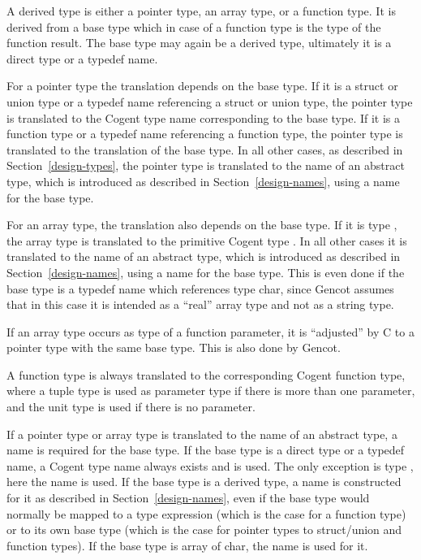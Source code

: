 A derived type is either a pointer type, an array type, or a function type. It is derived from a base type
which in case of a function type is the type of the function result. The base type may again be a derived
type, ultimately it is a direct type or a typedef name.

For a pointer type the translation depends on the base type. If it is a struct or union type or a typedef
name referencing a struct or union type, the pointer type is translated to the Cogent type name corresponding
to the base type. If it is a function type or a typedef name referencing a function type, the pointer type 
is translated to the translation of the base type. In all other cases, as described in Section~\ref{design-types}, 
the pointer type is translated to the name of an abstract type, which is introduced as described in 
Section~\ref{design-names}, using a name for the base type. 

For an array type, the translation also depends on the base type. If it is type , the array 
type is translated to the primitive Cogent type . In all other cases it is translated 
to the name of an abstract type, which is introduced as described in Section~\ref{design-names}, 
using a name for the base type. This is even done if the base type is a typedef name which references
type char, since Gencot assumes that in this case it is intended as a ``real'' array type and not
as a string type.

If an array type occurs as type of a function parameter, it is ``adjusted'' by C to a pointer type with
the same base type. This is also done by Gencot. 

A function type is always translated to the corresponding Cogent function type, where a tuple type is
used as parameter type if there is more than one parameter, and the unit type is used if there is
no parameter. 

If a pointer type or array type is translated to the name of an abstract type, a name is required for
the base type. If the base type is a direct type or a typedef name, a Cogent type name always exists 
and is used. The only exception is type , here the name  is used.
If the base type is a derived type, a name is constructed for it as described in Section~\ref{design-names},
even if the base type would normally be mapped to a type expression (which is the case for a function type)
or to its own base type (which is the case for pointer types to struct/union and function types). If the
base type is array of char, the name  is used for it. 


